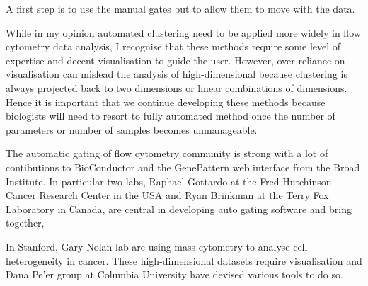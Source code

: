 A first step is to use the manual gates but to allow them to move with the data.

While in my opinion automated clustering need to be applied more widely in flow cytometry data analysis,
I recognise that these methods require some level of expertise and decent visualisation to guide the user.
However, over-reliance on visualisation can mislead the analysis of high-dimensional because clustering is always projected back to two dimensions
or linear combinations of dimensions.
Hence it is important that we continue developing these methods because biologists will need to resort to fully automated method once the number of parameters
or number of samples becomes unmanageable.

The automatic gating of flow cytometry community is strong with a lot of contibutions to BioConductor and the GenePattern web interface from the Broad Institute.
In particular two labs,
Raphael Gottardo at the Fred Hutchinson Cancer Research Center in the USA
and
Ryan Brinkman at the Terry Fox Laboratory in Canada,
are central in developing auto gating software and bring together,

In Stanford, Gary Nolan lab are using mass cytometry to analyse cell heterogeneity in cancer.
These high-dimensional datasets require visualisation and Dana Pe'er group at Columbia University have devised various tools to do so.









